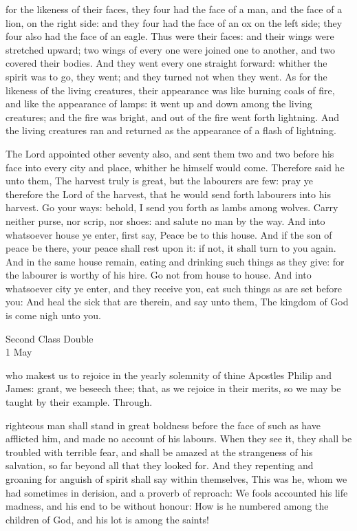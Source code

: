 for the likeness of their faces, they four had the face of a man, and the face of a lion, on the right side: and they four had the face of an ox on the left side; they four also had the face of an eagle. Thus were their faces: and their wings were stretched upward; two wings of every one were joined one to another, and two covered their bodies. And they went every one straight forward: whither the spirit was to go, they went; and they turned not when they went. As for the likeness of the living creatures, their appearance was like burning coals of fire, and like the appearance of lamps: it went up and down among the living creatures; and the fire was bright, and out of the fire went forth lightning. And the living creatures ran and returned as the appearance of a flash of lightning.

 The Lord appointed other seventy also, and sent them two and two before his face into every city and place, whither he himself would come. Therefore said he unto them, The harvest truly is great, but the labourers are few: pray ye therefore the Lord of the harvest, that he would send forth labourers into his harvest. Go your ways: behold, I send you forth as lambs among wolves. Carry neither purse, nor scrip, nor shoes: and salute no man by the way. And into whatsoever house ye enter, first say, Peace be to this house. And if the son of peace be there, your peace shall rest upon it: if not, it shall turn to you again. And in the same house remain, eating and drinking such things as they give: for the labourer is worthy of his hire. Go not from house to house. And into whatsoever city ye enter, and they receive you, eat such things as are set before you: And heal the sick that are therein, and say unto them, The kingdom of God is come nigh unto you.

\begin{inhead}
    {Second Class Double\\
1 May}
\end{inhead}

\collect
{} who makest us to rejoice in the yearly solemnity of thine Apostles Philip and James: grant, we beseech thee; that, as we rejoice in their merits, so we may be taught by their example. Through.

 righteous man shall stand in great boldness before the face of such as have afflicted him, and made no account of his labours. When they see it, they shall be troubled with terrible fear, and shall be amazed at the strangeness of his salvation, so far beyond all that they looked for. And they repenting and groaning for anguish of spirit shall say within themselves, This was he, whom we had sometimes in derision, and a proverb of reproach: We fools accounted his life madness, and his end to be without honour: How is he numbered among the children of God, and his lot is among the saints!

